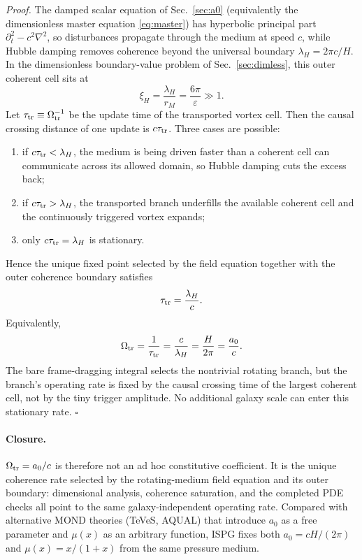 \documentclass[11pt]{article}
\begin{document}
\textit{Proof.}
The damped scalar equation of Sec.~\ref{sec:a0} (equivalently the
dimensionless master equation \eqref{eq:master}) has hyperbolic
principal part $\partial_t^2-c^2\nabla^2$, so disturbances propagate
through the medium at speed $c$, while Hubble damping removes coherence
beyond the universal boundary $\lambda_H=2\pi c/H$.  In the
dimensionless boundary-value problem of Sec.~\ref{sec:dimless}, this
outer coherent cell sits at
\[
\xi_H=\frac{\lambda_H}{r_M}=\frac{6\pi}{\varepsilon}\gg1.
\]
Let $\tau_{\rm tr}\equiv \Omega_{\rm tr}^{-1}$ be the update time of the
transported vortex cell.  Then the causal crossing distance of one update
is $c\tau_{\rm tr}$.  Three cases are possible:
\begin{enumerate}
\item if $c\tau_{\rm tr}<\lambda_H$, the medium is being driven faster than
  a coherent cell can communicate across its allowed domain, so Hubble
  damping cuts the excess back;
\item if $c\tau_{\rm tr}>\lambda_H$, the transported branch underfills the
  available coherent cell and the continuously triggered vortex expands;
\item only $c\tau_{\rm tr}=\lambda_H$ is stationary.
\end{enumerate}
Hence the unique fixed point selected by the field equation together with
the outer coherence boundary satisfies
\[
\tau_{\rm tr}=\frac{\lambda_H}{c}.
\]
Equivalently,
\[
\Omega_{\rm tr}=\frac{1}{\tau_{\rm tr}}=\frac{c}{\lambda_H}
=\frac{H}{2\pi}=\frac{a_0}{c}.
\]
The bare frame-dragging integral selects the nontrivial rotating branch,
but the branch's operating rate is fixed by the causal crossing time of
the largest coherent cell, not by the tiny trigger amplitude.  No
additional galaxy scale can enter this stationary rate. \hfill$\square$

\paragraph{Closure.}
$\Omega_{\rm tr}=a_0/c$ is therefore not an ad hoc constitutive
coefficient.  It is the unique coherence rate selected by
the rotating-medium field equation and its outer boundary:
dimensional analysis, coherence saturation, and the completed
PDE checks all point to the same
galaxy-independent operating rate.  Compared with alternative MOND theories
(TeVeS, AQUAL) that introduce $a_0$ as a free parameter and
$\mu(x)$ as an arbitrary function, ISPG fixes both
$a_0=cH/(2\pi)$ and $\mu(x)=x/(1+x)$ from the same pressure
medium.
\end{document}
